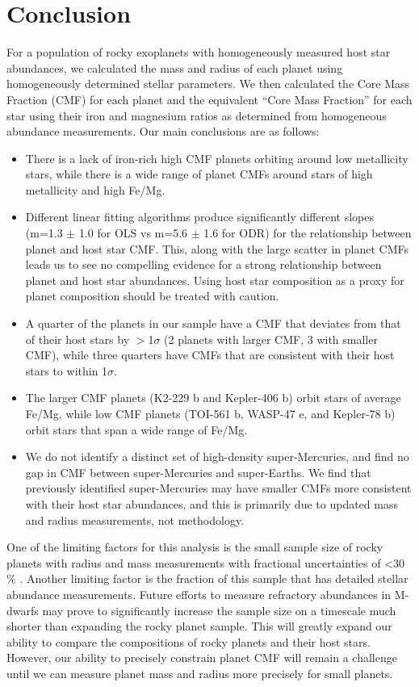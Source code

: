 \documentclass[twocolumn]{aastex631}
\begin{document}
\section{Conclusion}
\label{sec:conclusion}

For a population of rocky exoplanets with homogeneously measured host star abundances, we calculated the mass and radius of each planet using homogeneously determined stellar parameters. We then calculated the Core Mass Fraction (CMF) for each planet and the equivalent ``Core Mass Fraction'' for each star using their iron and magnesium ratios as determined from homogeneous abundance measurements. Our main conclusions are as follows:
\begin{itemize}
    \item There is a lack of iron-rich high CMF planets orbiting around low metallicity stars, while there is a wide range of planet CMFs around stars of high metallicity and high Fe/Mg. 
    \item Different linear fitting algorithms produce significantly different slopes (m=1.3 $\pm$ 1.0 for OLS vs m=5.6 $\pm$ 1.6 for ODR) for the relationship between planet and host star CMF. This, along with the large scatter in planet CMFs leads us to see no compelling evidence for a strong relationship between planet and host star abundances. Using host star composition as a proxy for planet composition should be treated with caution. 
    \item A quarter of the planets in our sample have a CMF that deviates from that of their host stars by $>$1$\sigma$ (2 planets with larger CMF, 3 with smaller CMF), while three quarters have CMFs that are consistent with their host stars to within 1$\sigma$. 
    \item The larger CMF planets (K2-229 b and Kepler-406 b) orbit stars of average Fe/Mg, while low CMF planets (TOI-561 b, WASP-47 e, and Kepler-78 b) orbit stars that span a wide range of Fe/Mg. 
    \item We do not identify a distinct set of high-density super-Mercuries, and find no gap in CMF between super-Mercuries and super-Earths. We find that previously identified super-Mercuries may have smaller CMFs more consistent with their host star abundances, and this is primarily due to updated mass and radius measurements, not methodology. 
\end{itemize}

One of the limiting factors for this analysis is the small sample size of rocky planets with radius and mass measurements with fractional uncertainties of <30$\%$ . Another limiting factor is the fraction of this sample that has detailed stellar abundance measurements. Future efforts to measure refractory abundances in M-dwarfs may prove to significantly increase the sample size on a timescale much shorter than expanding the rocky planet sample. This will greatly expand our ability to compare the compositions of rocky planets and their host stars. However, our ability to precisely constrain planet CMF will remain a challenge until we can measure planet mass and radius more precisely for small planets.
\end{document}
